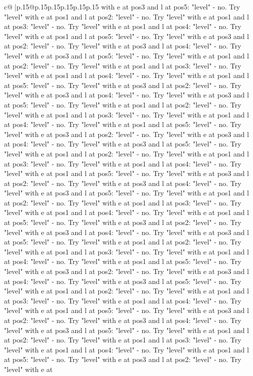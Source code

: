 \documentclass{article}
\begin{document}
{\begin{supertabular}{c@{$\;$}|p{.15\linewidth}@{}p{.15\linewidth}p{.15\linewidth}p{.15\linewidth}p{.15\linewidth}p{.15\linewidth}}
{{{with e at pos3 and l at pos5: "level" {-} no. Try "level" with e at pos1 and l at pos2: "level" {-} no. Try "level" with e at pos1 and l at pos3: "level" {-} no. Try "level" with e at pos1 and l at pos4: "level" {-} no. Try "level" with e at pos1 and l at pos5: "level" {-} no. Try "level" with e at pos3 and l at pos2: "level" {-} no. Try "level" with e at pos3 and l at pos4: "level" {-} no. Try "level" with e at pos3 and l at pos5: "level" {-} no. Try "level" with e at pos1 and l at pos2: "level" {-} no. Try "level" with e at pos1 and l at pos3: "level" {-} no. Try "level" with e at pos1 and l at pos4: "level" {-} no. Try "level" with e at pos1 and l at pos5: "level" {-} no. Try "level" with e at pos3 and l at pos2: "level" {-} no. Try "level" with e at pos3 and l at pos4: "level" {-} no. Try "level" with e at pos3 and l at pos5: "level" {-} no. Try "level" with e at pos1 and l at pos2: "level" {-} no. Try "level" with e at pos1 and l at pos3: "level" {-} no. Try "level" with e at pos1 and l at pos4: "level" {-} no. Try "level" with e at pos1 and l at pos5: "level" {-} no. Try "level" with e at pos3 and l at pos2: "level" {-} no. Try "level" with e at pos3 and l at pos4: "level" {-} no. Try "level" with e at pos3 and l at pos5: "level" {-} no. Try "level" with e at pos1 and l at pos2: "level" {-} no. Try "level" with e at pos1 and l at pos3: "level" {-} no. Try "level" with e at pos1 and l at pos4: "level" {-} no. Try "level" with e at pos1 and l at pos5: "level" {-} no. Try "level" with e at pos3 and l at pos2: "level" {-} no. Try "level" with e at pos3 and l at pos4: "level" {-} no. Try "level" with e at pos3 and l at pos5: "level" {-} no. Try "level" with e at pos1 and l at pos2: "level" {-} no. Try "level" with e at pos1 and l at pos3: "level" {-} no. Try "level" with e at pos1 and l at pos4: "level" {-} no. Try "level" with e at pos1 and l at pos5: "level" {-} no. Try "level" with e at pos3 and l at pos2: "level" {-} no. Try "level" with e at pos3 and l at pos4: "level" {-} no. Try "level" with e at pos3 and l at pos5: "level" {-} no. Try "level" with e at pos1 and l at pos2: "level" {-} no. Try "level" with e at pos1 and l at pos3: "level" {-} no. Try "level" with e at pos1 and l at pos4: "level" {-} no. Try "level" with e at pos1 and l at pos5: "level" {-} no. Try "level" with e at pos3 and l at pos2: "level" {-} no. Try "level" with e at pos3 and l at pos4: "level" {-} no. Try "level" with e at pos3 and l at pos5: "level" {-} no. Try "level" with e at pos1 and l at pos2: "level" {-} no. Try "level" with e at pos1 and l at pos3: "level" {-} no. Try "level" with e at pos1 and l at pos4: "level" {-} no. Try "level" with e at pos1 and l at pos5: "level" {-} no. Try "level" with e at pos3 and l at pos2: "level" {-} no. Try "level" with e at pos3 and l at pos4: "level" {-} no. Try "level" with e at pos3 and l at pos5: "level" {-} no. Try "level" with e at pos1 and l at pos2: "level" {-} no. Try "level" with e at pos1 and l at pos3: "level" {-} no. Try "level" with e at pos1 and l at pos4: "level" {-} no. Try "level" with e at pos1 and l at pos5: "level" {-} no. Try "level" with e at pos3 and l at pos2: "level" {-} no. Try "level" with e at }}}
\end{supertabular}}
\end{document}
